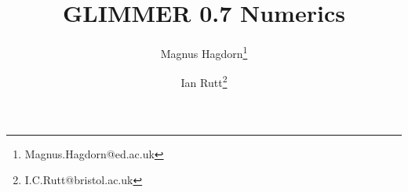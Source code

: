 \newcommand{\dir}{num}

\pagestyle{myheadings}


\title{GLIMMER 0.7 Numerics}
\author{Magnus Hagdorn\thanks{Magnus.Hagdorn@ed.ac.uk} \and Ian Rutt\thanks{I.C.Rutt@bristol.ac.uk}}
\maketitle
\tableofcontents
\newpage




